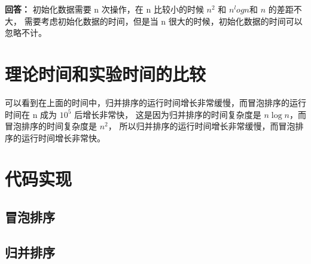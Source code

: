 \documentclass[UTF8]{ctexart}
\begin{document}
\textbf{回答：} 初始化数据需要 n 次操作，在 n 比较小的时候 $n ^ 2$ 和 $ n ^ log n$和 $n$ 的差距不大，
需要考虑初始化数据的时间，但是当 n 很大的时候，初始化数据的时间可以忽略不计。

\section{理论时间和实验时间的比较}
可以看到在上面的时间中，归并排序的运行时间增长非常缓慢，而冒泡排序的运行时间在 n 成为 $10^5$ 后增长非常快，
这是因为归并排序的时间复杂度是 $n \log n$，而冒泡排序的时间复杂度是 $n ^ 2$，
所以归并排序的运行时间增长非常缓慢，而冒泡排序的运行时间增长非常快。

\section{代码实现}
\subsection{冒泡排序}

\subsection{归并排序}

\end{document}
